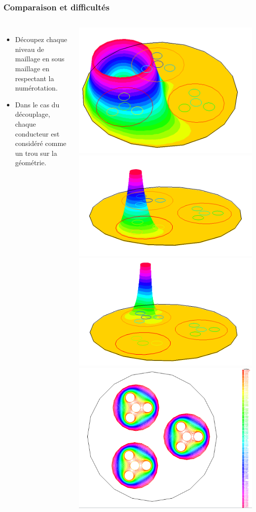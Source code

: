 \begin{frame}
  \frametitle{Comparaison et difficultés}
  \begin{columns}[T]
  \begin{itemize}
      \item Découpez chaque niveau de maillage en sous maillage en respectant la numérotation.
      \item Dans le cas du découplage, chaque conducteur est considéré comme un trou sur la
          géométrie.
  \end{itemize}
  \includegraphics[width=.5\linewidth]{figures/figures/gui/sol3Dfull2-1.png}
  \includegraphics[width=.5\linewidth]{figures/figures/gui/sol3Dfull2-2.png}\\
  \includegraphics[width=.5\linewidth]{figures/figures/gui/sol3Dfull2-3.png}
  \includegraphics[width=.5\linewidth]{figures/figures/gui/sol3Dfull2-4.png}
  \end{columns}
\end{frame}
